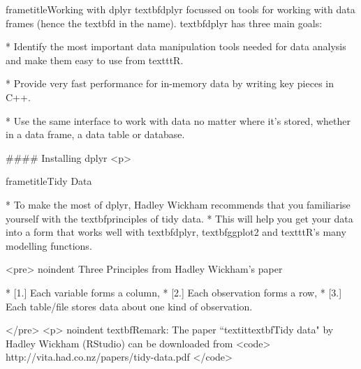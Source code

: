 	
	
		
		frametitle{Working with dplyr} textbf{dplyr} focussed on tools for working with data frames (hence the textbf{d} in the name). 
		textbf{dplyr} has three main goals:
		
		
			         * Identify the most important data manipulation tools needed for data analysis and make them easy to use from texttt{R}.
			
			         * Provide very fast performance for in-memory data by writing key pieces in C++.
			
			         * Use the same interface to work with data no matter where it's stored, whether in a data frame, a data table or database.
		
	
#### {Installing dplyr}
<p>
	
		frametitle{Tidy Data}
		
			
			         * To make the most of dplyr, Hadley Wickham recommends that you familiarise yourself with the textbf{principles of tidy data}. 
			         * This will help you get your data into a form that works well with textbf{dplyr}, textbf{ggplot2} and texttt{R}'s many modelling functions.
		
	
	
	
		<pre>
			noindent Three Principles from Hadley Wickham's paper
			
				        * [1.] Each variable forms a column, 
				        * [2.] Each observation forms a row, 
				        * [3.] Each table/file stores data about one kind of observation.
			
		</pre>
<p>
		noindent textbf{Remark:}   The paper ``textit{textbf{Tidy data}}" by Hadley Wickham (RStudio) can be downloaded from 
		<code>
		http://vita.had.co.nz/papers/tidy-data.pdf
		</code>
	
	
